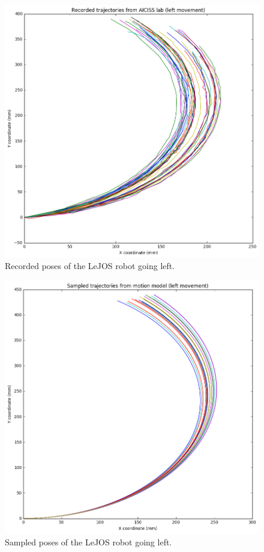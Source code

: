 \documentclass[paper=a4, fontsize=11pt]{scrartcl} %
\begin{document}
    \begin{figure}[H]
        \begin{center}
            \setlength{\fboxsep}{0.5pt} %
            \setlength{\fboxrule}{0.5pt}
            \includegraphics[width=0.65\linewidth,fbox]{images/recorded_poses_left.png}
            \caption{Recorded poses of the LeJOS robot going left.}
        \end{center}
    \end{figure}

    \begin{figure}[h!]
        \begin{center}
            \setlength{\fboxsep}{0.5pt} %
            \setlength{\fboxrule}{0.5pt}
            \includegraphics[width=0.65\linewidth,fbox]{images/sampled_poses_left.png}
            \caption{Sampled poses of the LeJOS robot going left.}
        \end{center}
    \end{figure}
\end{document}

